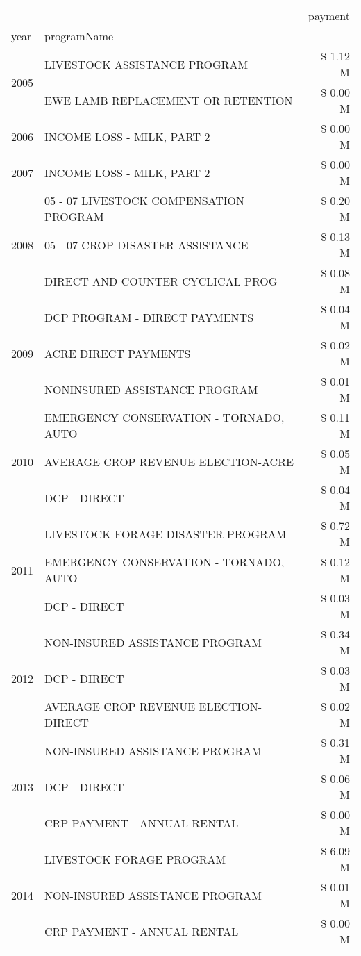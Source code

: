 \begin{tabular}{llr}
\toprule
 &  & payment \\
year & programName &  \\
\midrule
\multirow[t]{2}{*}{2005} & LIVESTOCK ASSISTANCE PROGRAM & \$ 1.12 M \\
 & EWE LAMB REPLACEMENT OR RETENTION & \$ 0.00 M \\
\cline{1-3}
2006 & INCOME LOSS - MILK, PART 2 & \$ 0.00 M \\
\cline{1-3}
2007 & INCOME LOSS - MILK, PART 2 & \$ 0.00 M \\
\cline{1-3}
\multirow[t]{3}{*}{2008} & 05 - 07 LIVESTOCK COMPENSATION PROGRAM & \$ 0.20 M \\
 & 05 - 07 CROP DISASTER ASSISTANCE & \$ 0.13 M \\
 & DIRECT AND COUNTER CYCLICAL PROG & \$ 0.08 M \\
\cline{1-3}
\multirow[t]{3}{*}{2009} & DCP PROGRAM - DIRECT PAYMENTS & \$ 0.04 M \\
 & ACRE DIRECT PAYMENTS & \$ 0.02 M \\
 & NONINSURED ASSISTANCE PROGRAM & \$ 0.01 M \\
\cline{1-3}
\multirow[t]{3}{*}{2010} & EMERGENCY CONSERVATION - TORNADO, AUTO & \$ 0.11 M \\
 & AVERAGE CROP REVENUE ELECTION-ACRE & \$ 0.05 M \\
 & DCP - DIRECT & \$ 0.04 M \\
\cline{1-3}
\multirow[t]{3}{*}{2011} & LIVESTOCK FORAGE DISASTER PROGRAM & \$ 0.72 M \\
 & EMERGENCY CONSERVATION - TORNADO, AUTO & \$ 0.12 M \\
 & DCP - DIRECT & \$ 0.03 M \\
\cline{1-3}
\multirow[t]{3}{*}{2012} & NON-INSURED ASSISTANCE PROGRAM & \$ 0.34 M \\
 & DCP - DIRECT & \$ 0.03 M \\
 & AVERAGE CROP REVENUE ELECTION-DIRECT & \$ 0.02 M \\
\cline{1-3}
\multirow[t]{3}{*}{2013} & NON-INSURED ASSISTANCE PROGRAM & \$ 0.31 M \\
 & DCP - DIRECT & \$ 0.06 M \\
 & CRP PAYMENT - ANNUAL RENTAL & \$ 0.00 M \\
\cline{1-3}
\multirow[t]{3}{*}{2014} & LIVESTOCK FORAGE PROGRAM & \$ 6.09 M \\
 & NON-INSURED ASSISTANCE PROGRAM & \$ 0.01 M \\
 & CRP PAYMENT - ANNUAL RENTAL & \$ 0.00 M \\

\end{tabular}
